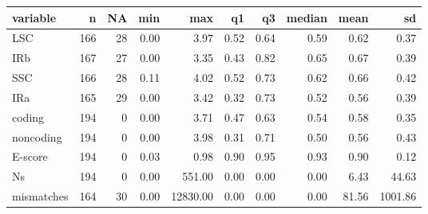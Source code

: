 \begin{table}[ht]
\centering
\begin{tabular}{lrrrrrrrrr}
  \hline
variable & n & NA & min & max & q1 & q3 & median & mean & sd \\ 
  \hline
LSC & 166 & 28 & 0.00 & 3.97 & 0.52 & 0.64 & 0.59 & 0.62 & 0.37 \\ 
  IRb & 167 & 27 & 0.00 & 3.35 & 0.43 & 0.82 & 0.65 & 0.67 & 0.39 \\ 
  SSC & 166 & 28 & 0.11 & 4.02 & 0.52 & 0.73 & 0.62 & 0.66 & 0.42 \\ 
  IRa & 165 & 29 & 0.00 & 3.42 & 0.32 & 0.73 & 0.52 & 0.56 & 0.39 \\ 
  coding & 194 & 0 & 0.00 & 3.71 & 0.47 & 0.63 & 0.54 & 0.58 & 0.35 \\ 
  noncoding & 194 & 0 & 0.00 & 3.98 & 0.31 & 0.71 & 0.50 & 0.56 & 0.43 \\ 
  E-score & 194 & 0 & 0.03 & 0.98 & 0.90 & 0.95 & 0.93 & 0.90 & 0.12 \\ 
  Ns & 194 & 0 & 0.00 & 551.00 & 0.00 & 0.00 & 0.00 & 6.43 & 44.63 \\ 
  mismatches & 164 & 30 & 0.00 & 12830.00 & 0.00 & 0.00 & 0.00 & 81.56 & 1001.86 \\ 
   \hline
\end{tabular}
\end{table}
